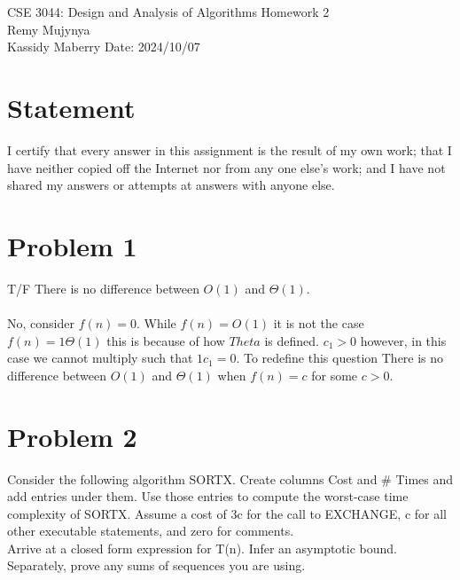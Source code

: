 \documentclass{article}
\begin{document}
\begin{center}
    {\huge
        CSE 3044: Design and Analysis of Algorithms Homework 2\\
    }
    {\large Remy Mujynya\\
          Kassidy Maberry}
    Date: 2024/10/07
\end{center}
\section*{Statement}
I certify that every answer in this assignment is the result of my own work; that
I have neither copied off the Internet nor from any one else's work; and I have
not shared my answers or attempts at answers with anyone else.\\

\section*{Problem 1}
T/F There is no difference between $O(1)$ and $\Theta(1)$.\\\\

No, consider $f(n) = 0$. While $f(n) = O(1)$ it is not 
the case $f(n) = 1\Theta(1)$ this is because of how $Theta$ is defined.
$c_{1} > 0$ however, in this case we cannot multiply such that $1c_{1} = 0$.
To redefine this question There is no difference between $O(1)$ and $\Theta(1)$ when 
$f(n) = c$ for some $c > 0$.\\

\section*{Problem 2}
Consider the following algorithm SORTX. Create columns Cost and \# Times and add
entries under them. Use those entries to compute the worst-case time complexity
of SORTX. Assume a cost of 3c for the call to EXCHANGE, c for all other executable
statements, and zero for comments.\\
Arrive at a closed form expression for T(n). Infer an asymptotic bound.\\
Separately, prove any sums of sequences you are using.\\\\
\end{document}
